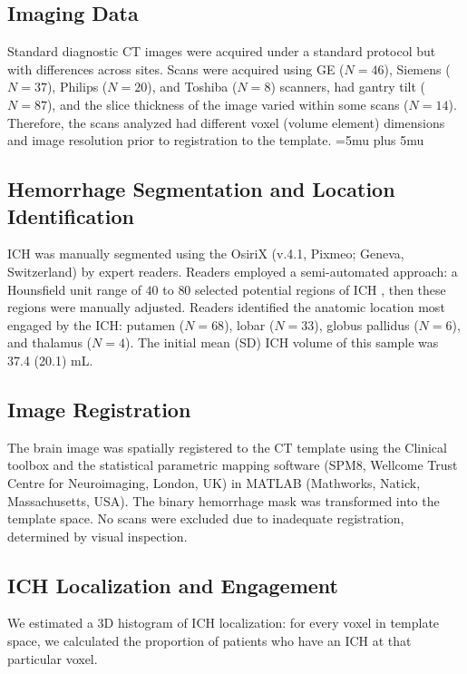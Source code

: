 \documentclass[12pt]{article}\usepackage[]{graphicx}\usepackage[]{color}
\begin{document}
\begin{refsection}
\subsection*{Imaging Data}
Standard diagnostic CT images were acquired under a standard protocol but with differences across sites.  Scans were acquired using GE ($N{=}46$), Siemens ($N{=}37$), Philips ($N{=}20$), and Toshiba ($N{=}8$) scanners, had gantry tilt ($N{=}87$), and the slice thickness of the image varied within some scans ($N{=}14$). Therefore, the scans analyzed had different voxel (volume element) dimensions and image resolution prior to registration to the template. 
\thickmuskip=5mu plus 5mu


\subsection*{Hemorrhage Segmentation and Location Identification}
ICH was manually segmented using the OsiriX (v.4.1, Pixmeo; Geneva, Switzerland) by expert readers.  Readers employed a semi-automated approach: a Hounsfield unit range of $40$ to $80$ selected potential regions of ICH \citep{bergstrom_variation_1977, smith_imaging_2006}, then these regions were manually adjusted. Readers identified the anatomic location most engaged by the ICH: putamen ($N{=}68$), lobar ($N{=}33$), globus pallidus ($N{=}6$), and thalamus ($N{=}4$).  The initial mean (SD) ICH volume of this sample was 37.4 (20.1) mL.


\subsection*{Image Registration}
The brain image was spatially registered to the CT template using the Clinical toolbox \citep{rorden_age-specific_2012} and the statistical parametric mapping software (SPM8, Wellcome Trust Centre for Neuroimaging, London, UK) in MATLAB (Mathworks, Natick, Massachusetts, USA).  The binary hemorrhage mask was transformed into the template space. No scans were excluded due to inadequate registration, determined by visual inspection.


\subsection*{ICH Localization and Engagement}
\label{sec:engage}
We estimated a 3D histogram of ICH localization: for every voxel in template space, we calculated the proportion of patients who have an ICH at that particular voxel.  
 

\end{refsection}
\end{document}
